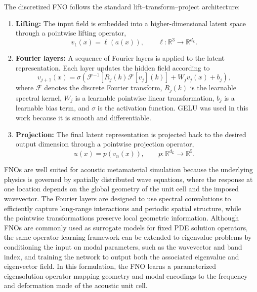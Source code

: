 \documentclass[preprint,review,12pt,numafflabel]{elsarticle}
\begin{document}
The discretized FNO follows the standard lift--transform--project architecture:
\begin{enumerate}
\item \textbf{Lifting:} The input field is embedded into a higher-dimensional latent space through a pointwise lifting operator,
\begin{equation}
v_1(x)=\ell(a(x)),
\qquad
\ell:\mathbb{R}^{3}\rightarrow\mathbb{R}^{d_L}.
\end{equation}

\item \textbf{Fourier layers:} A sequence of Fourier layers is applied to the latent representation. Each layer updates the hidden field according to
\begin{equation}
v_{j+1}(x)
=
\sigma\left(
\mathcal{F}^{-1}
\left[
R_j(k)\mathcal{F}[v_j](k)
\right]
+
W_jv_j(x)
+
b_j
\right),
\end{equation}
where $\mathcal{F}$ denotes the discrete Fourier transform, $R_j(k)$ is the learnable spectral kernel, $W_j$ is a learnable pointwise linear transformation, $b_j$ is a learnable bias term, and $\sigma$ is the activation function. GELU was used in this work because it is smooth and differentiable.

\item \textbf{Projection:} The final latent representation is projected back to the desired output dimension through a pointwise projection operator,
\begin{equation}
u(x)=p(v_n(x)),
\qquad
p:\mathbb{R}^{d_L}\rightarrow\mathbb{R}^{5}.
\end{equation}
\end{enumerate}

FNOs are well suited for acoustic metamaterial simulation because the underlying physics is governed by spatially distributed wave equations, where the response at one location depends on the global geometry of the unit cell and the imposed wavevector. The Fourier layers are designed to use spectral convolutions to efficiently capture long-range interactions and periodic spatial structure, while the pointwise transformations preserve local geometric information. Although FNOs are commonly used as surrogate models for fixed PDE solution operators, the same operator-learning framework can be extended to eigenvalue problems by conditioning the input on modal parameters, such as the wavevector and band index, and training the network to output both the associated eigenvalue and eigenvector field. In this formulation, the FNO learns a parameterized eigensolution operator mapping geometry and modal encodings to the frequency and deformation mode of the acoustic unit cell.
\end{document}
